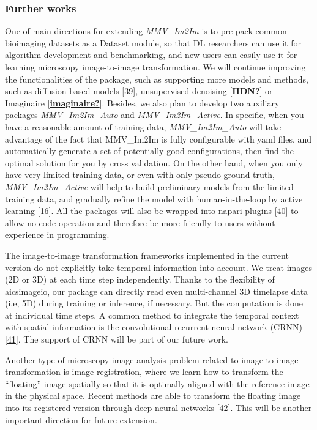 \hypertarget{further-works}{%
\subsubsection{Further works}\label{further-works}}

One of main directions for extending \emph{MMV\_Im2Im} is to pre-pack common bioimaging datasets as a Dataset module, so that DL researchers can use it for algorithm development and benchmarking, and new users can easily use it for learning microscopy image-to-image transformation. We will continue improving the functionalities of the package, such as supporting more models and methods, such as diffusion based models {[}\protect\hyperlink{ref-1A3yurr7m}{39}{]}, unsupervised denoising {[}\protect\hyperlink{ref-HDN}{\textbf{HDN?}}{]} or Imaginaire {[}\protect\hyperlink{ref-imaginaire}{\textbf{imaginaire?}}{]}. Besides, we also plan to develop two auxiliary packages \emph{MMV\_Im2Im\_Auto} and \emph{MMV\_Im2Im\_Active}. In specific, when you have a reasonable amount of training data, \emph{MMV\_Im2Im\_Auto} will take advantage of the fact that MMV\_Im2Im is fully configurable with yaml files, and automatically generate a set of potentially good configurations, then find the optimal solution for you by cross validation. On the other hand, when you only have very limited training data, or even with only pseudo ground truth, \emph{MMV\_Im2Im\_Active} will help to build preliminary models from the limited training data, and gradually refine the model with human-in-the-loop by active learning {[}\protect\hyperlink{ref-jM3v1UjQ}{16}{]}. All the packages will also be wrapped into napari plugins {[}\protect\hyperlink{ref-YEMgt2T4}{40}{]} to allow no-code operation and therefore be more friendly to users without experience in programming.

The image-to-image transformation frameworks implemented in the current version do not explicitly take temporal information into account. We treat images (2D or 3D) at each time step independently. Thanks to the flexibility of aicsimageio, our package can directly read even multi-channel 3D timelapse data (i.e, 5D) during training or inference, if necessary. But the computation is done at individual time steps. A common method to integrate the temporal context with spatial information is the convolutional recurrent neural network (CRNN) {[}\protect\hyperlink{ref-s2RBSHdH}{41}{]}. The support of CRNN will be part of our future work.

Another type of microscopy image analysis problem related to image-to-image transformation is image registration, where we learn how to transform the ``floating'' image spatially so that it is optimally aligned with the reference image in the physical space. Recent methods are able to transform the floating image into its registered version through deep neural networks {[}\protect\hyperlink{ref-1Fh9QLxl9}{42}{]}. This will be another important direction for future extension.

